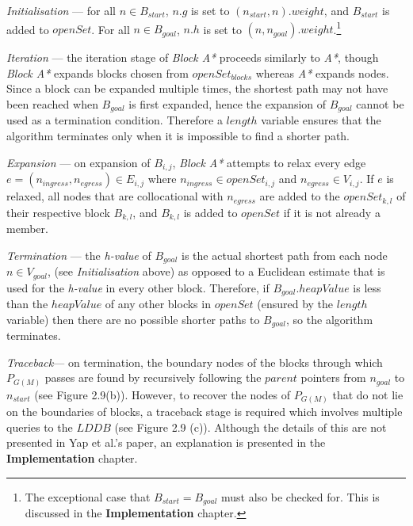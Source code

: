 \documentclass[12pt,notitlepage]{report}
\begin{document}
\begin{description}

\item[{\bfseries Algorithm walkthrough}]

\item{\em Initialisation} --- for all $n \in B_{start}$, $n.g$ is set to $(n_{start},n).weight$, and $B_{start}$ is added to $openSet$. For all $n \in B_{goal}$, $n.h$ is set to $(n,n_{goal}).weight$.\footnote{The exceptional case that $B_{start} = B_{goal}$ must also be checked for. This is discussed in the {\bfseries Implementation} chapter.}\\

\item{\em Iteration} --- the iteration stage of {\em Block A*} proceeds similarly to {\em A*}, though {\em Block A*} expands blocks chosen from $openSet_{blocks}$ whereas {\em A*} expands nodes. Since a block can be expanded multiple times, the shortest path may not have been reached when $B_{goal}$ is first expanded, hence the expansion of $B_{goal}$ cannot be used as a termination condition. Therefore a $length$ variable ensures that the algorithm terminates only when it is impossible to find a shorter path.\\

\item{\em Expansion} --- on expansion of $B_{i,j}$, {\em Block A*} attempts to relax every edge $e=(n_{ingress},n_{egress}) \in E_{i,j}$ where $n_{ingress} \in openSet_{i,j}$ and $n_{egress} \in V_{i,j}$. If $e$ is relaxed, all nodes that are collocational with $n_{egress}$ are added to the $openSet_{k,l}$ of their respective block $B_{k,l}$, and $B_{k,l}$ is added to $openSet$ if it is not already a member. \\

\item{\em Termination} --- the {\em h-value} of $B_{goal}$ is the actual shortest path from each node $n \in V_{goal}$, (see {\em Initialisation} above) as opposed to a Euclidean estimate that is used for the {\em h-value} in every other block. Therefore, if $B_{goal}.heapValue$ is less than the $heapValue$ of any other blocks in $openSet$ (ensured by the $length$ variable) then there are no possible shorter paths to $B_{goal}$, so the algorithm terminates.\\

\item{\em Traceback}--- on termination, the boundary nodes of the blocks through which $P_{G(M)}$ passes are found by recursively following the $parent$ pointers from $n_{goal}$ to $n_{start}$ (see Figure 2.9(b)). However, to recover the nodes of $P_{G(M)}$ that do not lie on the boundaries of blocks, a traceback stage is required which involves multiple queries to the $LDDB$ (see Figure 2.9 (c)). Although the details of this are not presented in Yap et al.'s paper, an explanation is presented in the {\bfseries Implementation} chapter.\\

\end{description}
\end{document}
